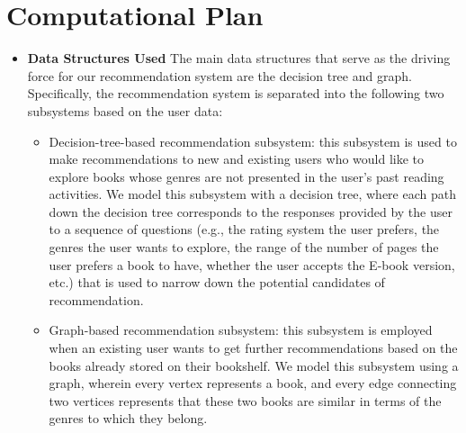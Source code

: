 \documentclass[fontsize=11pt]{article}
\begin{document}
\section*{Computational Plan}

\begin{itemize}

\item \textbf{Data Structures Used }The main data structures that serve as the driving force for our recommendation system are the decision tree and graph. Specifically, the recommendation system is separated into the following two subsystems based on the user data:
\begin{itemize} 
\item Decision-tree-based recommendation subsystem: this subsystem is used to make recommendations to new and existing users who would like to explore books whose genres are not presented in the user’s past reading activities. We model this subsystem with a decision tree, where each path down the decision tree corresponds to the responses provided by the user to a sequence of questions (e.g., the rating system the user prefers, the genres the user wants to explore, the range of the number of pages the user prefers a book to have, whether the user accepts the E-book version, etc.) that is used to narrow down the potential candidates of recommendation.
 
\item Graph-based recommendation subsystem: this subsystem is employed when an existing user wants to get further recommendations based on the books already stored on their bookshelf. We model this subsystem using a graph, wherein every vertex represents a book, and every edge connecting two vertices represents that these two books are similar in terms of the genres to which they belong.
\end{itemize}


\end{itemize}
\end{document}

